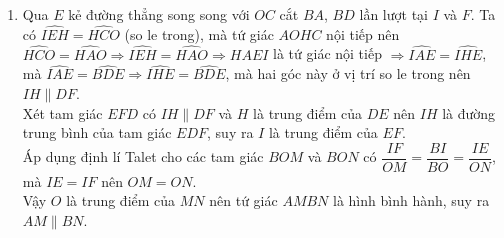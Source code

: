 \begin{ex}
{\begin{enumerate}
     	Vậy $\Delta ACD$ đồng dạng với $\Delta ECA$, từ đó suy ra $\dfrac{AC}{AD}=\dfrac{CE}{AE}\Rightarrow AC.AE=AD.CE$.
     	\item Qua $ E $ kẻ đường thẳng song song với $ OC $ cắt $BA$, $BD$ lần lượt tại $I$ và $F$. Ta có $\widehat{IEH}=\widehat{HCO}$ (so le trong), mà tứ giác $AOHC$ nội tiếp nên $\widehat{HCO}=\widehat{HAO}\Rightarrow\widehat{IEH}=\widehat{HAO}\Rightarrow HAEI$ là tứ giác nội tiếp $\Rightarrow\widehat{IAE}=\widehat{IHE}$, mà $\widehat{IAE}=\widehat{BDE}\Rightarrow\widehat{IHE}=\widehat{BDE}$, mà hai góc này ở vị trí so le trong nên $IH\parallel DF$.\\
     	Xét tam giác $EFD$ có $IH\parallel DF$ và $H$ là trung điểm của $DE$ nên $IH$ là đường trung bình của tam giác $EDF$, suy ra $I$ là trung điểm của $EF$.\\
     	Áp dụng định lí Talet cho các tam giác $BOM$ và $BON$ có $\dfrac{IF}{OM}=\dfrac{BI}{BO}=\dfrac{IE}{ON}$, mà $IE=IF$ nên $OM=ON$.\\
     	Vậy $O$ là trung điểm của $MN$ nên tứ giác $AMBN$ là hình bình hành, suy ra $AM\parallel BN$.
 \end{enumerate} }
\end{ex}
